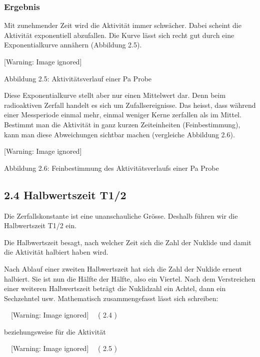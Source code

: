 \documentclass[12pt,a4paper,twoside]{article}
\begin{document}
\subsubsection*{Ergebnis}
Mit zunehmender Zeit wird die Aktivität immer schwächer. Dabei scheint die Aktivität exponentiell abzufallen. Die Kurve lässt sich recht gut durch eine Exponentialkurve annähern (Abbildung 2.5).

  [Warning: Image ignored] %
 

Abbildung 2.5: Aktivitätsverlauf einer Pa Probe

Diese Exponentialkurve stellt aber nur einen Mittelwert dar. Denn beim radioaktiven Zerfall handelt es sich um Zufallsereignisse. Das heisst, dass während einer Messperiode einmal mehr, einmal weniger Kerne zerfallen als im Mittel. Bestimmt man die Aktivität in ganz kurzen Zeiteinheiten (Feinbestimmung), kann man diese Abweichungen sichtbar machen (vergleiche Abbildung 2.6).

  [Warning: Image ignored] %
 

Abbildung 2.6: Feinbestimmung des Aktivitätsverlaufs einer Pa Probe

\subsection[2.4 Halbwertszeit T1/2]{2.4 Halbwertszeit T1/2}

\bigskip

Die Zerfallskonstante ist eine unanschauliche Grösse. Deshalb führen wir die Halbwertszeit T1/2 ein.

Die Halbwertszeit besagt, nach welcher Zeit sich die Zahl der Nuklide und damit die Aktivität halbiert haben wird.

Nach Ablauf einer zweiten Halbwertszeit hat sich die Zahl der Nuklide erneut halbiert. Sie ist nun die Hälfte der Hälfte, also ein Viertel. Nach dem Verstreichen einer weiteren Halbwertszeit beträgt die Nuklidzahl ein Achtel, dann ein Sechzehntel usw. Mathematisch zusammengefasst lässt sich schreiben:

\ \   [Warning: Image ignored] %
 \ \ ( 2.4 )

beziehungsweise für die Aktivität

\ \   [Warning: Image ignored] %
 \ \ ( 2.5 )
\end{document}
